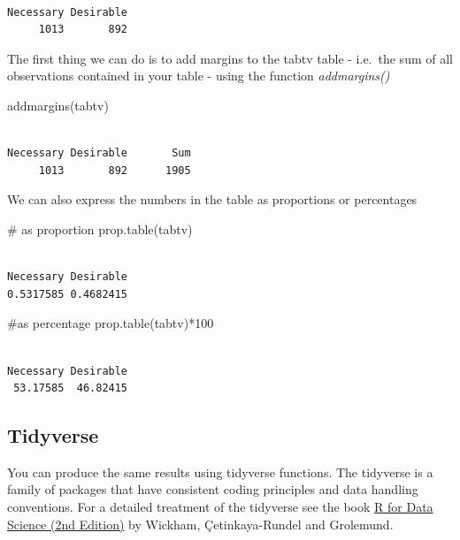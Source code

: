 \documentclass[
  letterpaper,
  DIV=11,
  numbers=noendperiod]{scrreprt}
\newenvironment{Shaded}{\begin{snugshade}}{\end{snugshade}}
\newcommand{\CommentTok}[1]{\textcolor[rgb]{0.37,0.37,0.37}{#1}}
\newcommand{\DecValTok}[1]{\textcolor[rgb]{0.68,0.00,0.00}{#1}}
\newcommand{\FunctionTok}[1]{\textcolor[rgb]{0.28,0.35,0.67}{#1}}
\newcommand{\NormalTok}[1]{\textcolor[rgb]{0.00,0.23,0.31}{#1}}
\newcommand{\SpecialCharTok}[1]{\textcolor[rgb]{0.37,0.37,0.37}{#1}}
\begin{document}
\begin{verbatim}

Necessary Desirable 
     1013       892 
\end{verbatim}

The first thing we can do is to add margins to the tabtv table -
i.e.~the sum of all observations contained in your table - using the
function \emph{addmargins()}

\begin{Shaded}
\begin{Highlighting}[]
\FunctionTok{addmargins}\NormalTok{(tabtv)}
\end{Highlighting}
\end{Shaded}

\begin{verbatim}

Necessary Desirable       Sum 
     1013       892      1905 
\end{verbatim}

We can also express the numbers in the table as proportions or
percentages

\begin{Shaded}
\begin{Highlighting}[]
\CommentTok{\# as proportion}
\FunctionTok{prop.table}\NormalTok{(tabtv)}
\end{Highlighting}
\end{Shaded}

\begin{verbatim}

Necessary Desirable 
0.5317585 0.4682415 
\end{verbatim}

\begin{Shaded}
\begin{Highlighting}[]
\CommentTok{\#as percentage}
\FunctionTok{prop.table}\NormalTok{(tabtv)}\SpecialCharTok{*}\DecValTok{100}
\end{Highlighting}
\end{Shaded}

\begin{verbatim}

Necessary Desirable 
 53.17585  46.82415 
\end{verbatim}

\subsection{Tidyverse}\label{tidyverse}

You can produce the same results using tidyverse functions. The
tidyverse is a family of packages that have consistent coding principles
and data handling conventions. For a detailed treatment of the tidyverse
see the book \href{https://r4ds.hadley.nz}{R for Data Science (2nd
Edition)} by Wickham, Çetinkaya-Rundel and Grolemund.
\end{document}

